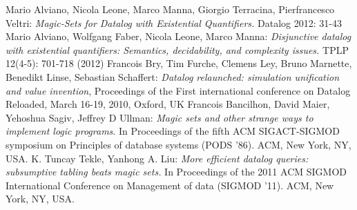 \documentclass{pracamgr}
\theoremstyle{plain}
\theoremstyle{definition}
\theoremstyle{remark}
\begin{document}
\begin{thebibliography}{99}
 Mario Alviano, Nicola Leone, Marco Manna, Giorgio Terracina, Pierfrancesco Veltri: \textit{Magic-Sets for Datalog with Existential Quantifiers.} Datalog 2012: 31-43
 Mario Alviano, Wolfgang Faber, Nicola Leone, Marco Manna: \textit{Disjunctive datalog with existential quantifiers: Semantics, decidability, and complexity issues.} TPLP 12(4-5): 701-718 (2012)
 Francois Bry, Tim Furche, Clemens Ley, Bruno Marnette, Benedikt Linse, Sebastian Schaffert: \textit{Datalog relaunched: simulation unification and value invention}, Proceedings of the First international conference on Datalog Reloaded, March 16-19, 2010, Oxford, UK
 Francois Bancilhon, David Maier, Yehoshua Sagiv, Jeffrey D Ullman: \textit{Magic sets and other strange ways to implement logic programs}. In Proceedings of the fifth ACM SIGACT-SIGMOD symposium on Principles of database systems (PODS '86). ACM, New York, NY, USA.
 K. Tuncay Tekle, Yanhong A. Liu: \textit{More efficient datalog queries: subsumptive tabling beats magic sets.} In Proceedings of the 2011 ACM SIGMOD International Conference on Management of data (SIGMOD '11). ACM, New York, NY, USA.

\end{thebibliography}
\end{document}
